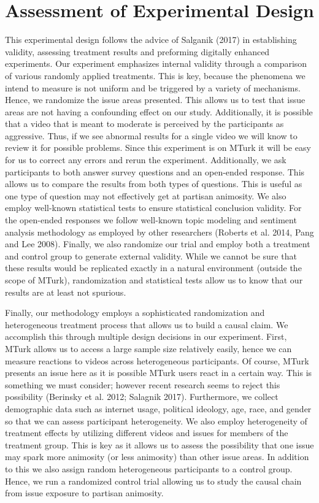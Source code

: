 \documentclass[12pt]{article}
\begin{document}
\section{Assessment of Experimental Design}

This experimental design follows the advice of Salganik (2017) in establishing validity, assessing treatment results and preforming digitally enhanced experiments. Our experiment emphasizes internal validity through a comparison of various randomly applied treatments. This is key, because the phenomena we intend to measure is not uniform and be triggered by a variety of mechanisms. Hence, we randomize the issue areas presented. This allows us to test that issue areas are not having a confounding effect on our study. Additionally, it is possible that a video that is meant to moderate is perceived by the participants as aggressive. Thus, if we see abnormal results for a single video we will know to review it for possible problems. Since this experiment is on MTurk it will be easy for us to correct any errors and rerun the experiment. Additionally, we ask participants to both answer survey questions and an open-ended response. This allows us to compare the results from both types of questions. This is useful as one type of question may not effectively get at partisan animosity. We also employ well-known statistical tests to ensure statistical conclusion validity. For the open-ended responses we follow well-known topic modeling and sentiment analysis methodology as employed by other researchers (Roberts et al. 2014, Pang and Lee 2008). Finally, we also randomize our trial and employ both a treatment and control group to generate external validity. While we cannot be sure that these results would be replicated exactly in a natural environment (outside the scope of MTurk), randomization and statistical tests allow us to know that our results are at least not spurious. 

Finally, our methodology employs a sophisticated randomization and heterogeneous treatment process that allows us to build a causal claim. We accomplish this through multiple design decisions in our experiment. First, MTurk allows us to access a large sample size relatively easily, hence we can measure reactions to videos across heterogeneous participants. Of course, MTurk presents an issue here as it is possible MTurk users react in a certain way. This is something we must consider; however recent research seems to reject this possibility (Berinsky et al. 2012; Salagnik 2017). Furthermore, we collect demographic data such as internet usage, political ideology, age, race, and gender so that we can assess participant heterogeneity. We also employ heterogeneity of treatment effects by utilizing different videos and issues for members of the treatment group. This is key as it allows us to assess the possibility that one issue may spark more animosity (or less animosity) than other issue areas. In addition to this we also assign random heterogeneous participants to a control group. Hence, we run a randomized control trial allowing us to study the causal chain from issue exposure to partisan animosity.  
\end{document}

